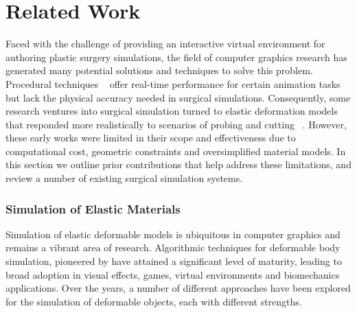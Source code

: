


\chapter{Related Work}

Faced with the challenge of providing an interactive virtual
environment for authoring plastic surgery simulations, the field of
computer graphics research has generated many potential solutions and
techniques to solve this problem. Procedural techniques
~\citep{JoshiMDGS:2007,WangP:2002,KavanCZO:2008,VaillBGCRWGP:2013} offer real-time
performance for certain animation tasks but lack the physical accuracy
needed in surgical simulations. Consequently, some research ventures
into surgical simulation turned to elastic deformation models
~\citep{TerzoPBF:1987} that responded more realistically to scenarios of
probing and cutting ~\citep{BroC:1996,MendoL:2003,NienhS:2001}. However,
these early works were limited in their scope and effectiveness due to
computational cost, geometric constraints and oversimplified material
models. In this section we outline prior contributions that help
address these limitations, and review a number of existing surgical
simulation systems.

\subsection{Simulation of Elastic Materials}

Simulation of elastic deformable models is ubiquitous in computer
graphics and remains a vibrant area of research. Algorithmic
techniques for deformable body simulation, pioneered by \citet{TerzoPBF:1987} have attained a significant level of
maturity, leading to broad adoption in visual effects, games, virtual
environments and biomechanics applications. Over the years, a number
of different approaches have been explored for the simulation of
deformable objects, each with different strengths. 

